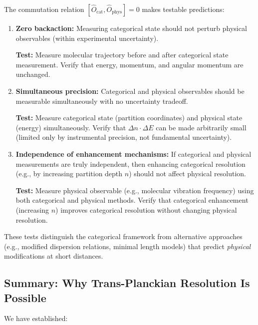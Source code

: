 \documentclass[twocolumn,10pt]{article}
\theoremstyle{remark}
\begin{document}
The commutation relation $[\hat{O}_{\text{cat}}, \hat{O}_{\text{phys}}] = 0$ makes testable predictions:

\begin{enumerate}
    \item \textbf{Zero backaction:} Measuring categorical state should not perturb physical observables (within experimental uncertainty).

    \textbf{Test:} Measure molecular trajectory before and after categorical state measurement. Verify that energy, momentum, and angular momentum are unchanged.

    \item \textbf{Simultaneous precision:} Categorical and physical observables should be measurable simultaneously with no uncertainty tradeoff.

    \textbf{Test:} Measure categorical state (partition coordinates) and physical state (energy) simultaneously. Verify that $\Delta n \cdot \Delta E$ can be made arbitrarily small (limited only by instrumental precision, not fundamental uncertainty).

    \item \textbf{Independence of enhancement mechanisms:} If categorical and physical measurements are truly independent, then enhancing categorical resolution (e.g., by increasing partition depth $n$) should not affect physical resolution.

    \textbf{Test:} Measure physical observable (e.g., molecular vibration frequency) using both categorical and physical methods. Verify that categorical enhancement (increasing $n$) improves categorical resolution without changing physical resolution.
\end{enumerate}

These tests distinguish the categorical framework from alternative approaches (e.g., modified dispersion relations, minimal length models) that predict \textit{physical} modifications at short distances.

\subsection{Summary: Why Trans-Planckian Resolution Is Possible}

We have established:
\end{document}
